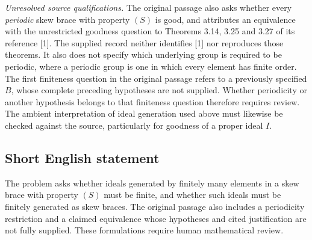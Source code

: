 \documentclass[11pt]{article}
\begin{document}
\textit{Unresolved source qualifications.} The original passage also asks whether every \emph{periodic} skew brace with property \((S)\) is good, and attributes an equivalence with the unrestricted goodness question to Theorems 3.14, 3.25 and 3.27 of its reference [1]. The supplied record neither identifies [1] nor reproduces those theorems. It also does not specify which underlying group is required to be periodic, where a periodic group is one in which every element has finite order. The first finiteness question in the original passage refers to a previously specified \(B\), whose complete preceding hypotheses are not supplied. Whether periodicity or another hypothesis belongs to that finiteness question therefore requires review. The ambient interpretation of ideal generation used above must likewise be checked against the source, particularly for goodness of a proper ideal \(I\).
\subsection{Short English statement}
The problem asks whether ideals generated by finitely many elements in a skew brace with property \((S)\) must be finite, and whether such ideals must be finitely generated as skew braces. The original passage also includes a periodicity restriction and a claimed equivalence whose hypotheses and cited justification are not fully supplied. These formulations require human mathematical review.
\end{document}
